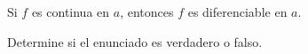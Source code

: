 \item Si $f$ es continua en $a$, entonces $f$ es diferenciable en $a$.
\par
Determine si el enunciado es verdadero o falso.
